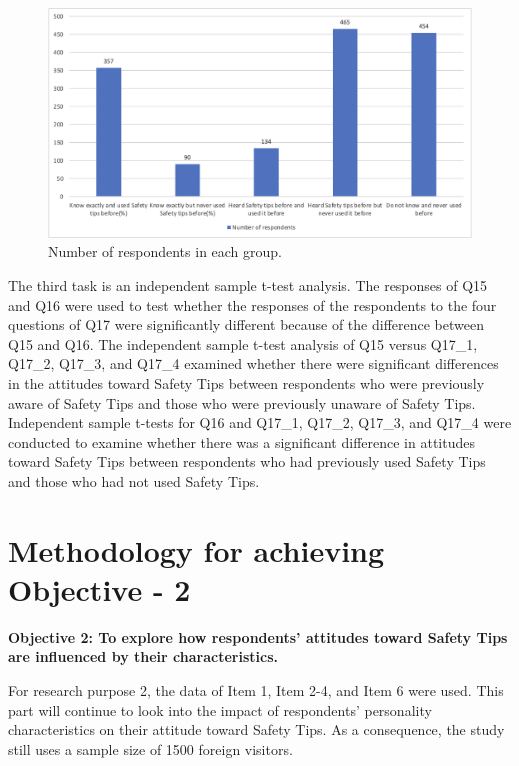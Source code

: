 \begin{figure}[h]
  \includegraphics[width=\linewidth]{Figure/Figure6.jpg}
  \centering
  \caption{Number of respondents in each group. }
  \label{fig6}
\end{figure}

The third task is an independent sample t-test analysis. The responses of Q15 and Q16 were used to test whether the responses of the respondents to the four questions of Q17 were significantly different because of the difference between Q15 and Q16. The independent sample t-test analysis of Q15 versus Q17\_1, Q17\_2, Q17\_3, and Q17\_4 examined whether there were significant differences in the attitudes toward Safety Tips between respondents who were previously aware of Safety Tips and those who were previously unaware of Safety Tips. Independent sample t-tests for Q16 and Q17\_1, Q17\_2, Q17\_3, and Q17\_4 were conducted to examine whether there was a significant difference in attitudes toward Safety Tips between respondents who had previously used Safety Tips and those who had not used Safety Tips.


\section{Methodology for achieving Objective - 2 }
\textbf{Objective 2: To explore how respondents' attitudes toward Safety Tips are influenced by their characteristics. }

For research purpose 2, the data of Item 1, Item 2-4, and Item 6 were used. This part will continue to look into the impact of respondents' personality characteristics on their attitude toward Safety Tips. As a consequence, the study still uses a sample size of 1500 foreign visitors.


